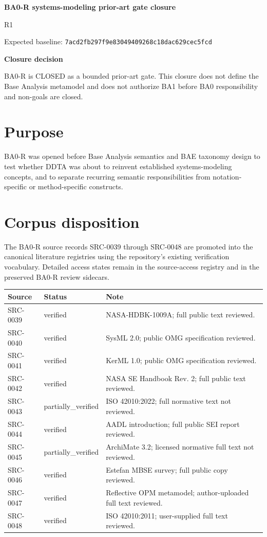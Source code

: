 \documentclass[10pt,a4paper]{article}
\newenvironment{gate}[1]{\def\FrameCommand{\fcolorbox{ddtagreen}{ddtagray}}\MakeFramed{\advance\hsize-2\width\FrameRestore}\noindent\textbf{#1}\par\smallskip}{\endMakeFramed}
\begin{document}
\begin{center}{\LARGE\bfseries BA0-R systems-modeling prior-art gate closure}\par{\large R1}\par{}\par{\small Expected baseline: \texttt{7acd2fb297f9e83049409268c18dac629cec5fcd}}\end{center}

\begin{gate}{Closure decision}
BA0-R is CLOSED as a bounded prior-art gate. This closure does not define the Base Analysis metamodel and does not authorize BA1 before BA0 responsibility and non-goals are closed.
\end{gate}

\section{Purpose}
BA0-R was opened before Base Analysis semantics and BAE taxonomy design to test whether DDTA was about to reinvent established systems-modeling concepts, and to separate recurring semantic responsibilities from notation-specific or method-specific constructs.

\section{Corpus disposition}
The BA0-R source records SRC-0039 through SRC-0048 are promoted into the canonical literature registries using the repository's existing verification vocabulary. Detailed access states remain in the source-access registry and in the preserved BA0-R review sidecars.

\small
\begin{tabularx}{\textwidth}{@{}>{\ttfamily}l l X@{}}
\toprule
Source & Status & Note \\
\midrule
SRC-0039 & verified & NASA-HDBK-1009A; full public text reviewed. \\
SRC-0040 & verified & SysML 2.0; public OMG specification reviewed. \\
SRC-0041 & verified & KerML 1.0; public OMG specification reviewed. \\
SRC-0042 & verified & NASA SE Handbook Rev. 2; full public text reviewed. \\
SRC-0043 & partially\_verified & ISO 42010:2022; full normative text not reviewed. \\
SRC-0044 & verified & AADL introduction; full public SEI report reviewed. \\
SRC-0045 & partially\_verified & ArchiMate 3.2; licensed normative full text not reviewed. \\
SRC-0046 & verified & Estefan MBSE survey; full public copy reviewed. \\
SRC-0047 & verified & Reflective OPM metamodel; author-uploaded full text reviewed. \\
SRC-0048 & verified & ISO 42010:2011; user-supplied full text reviewed. \\
\bottomrule
\end{tabularx}
\normalsize
\end{document}

